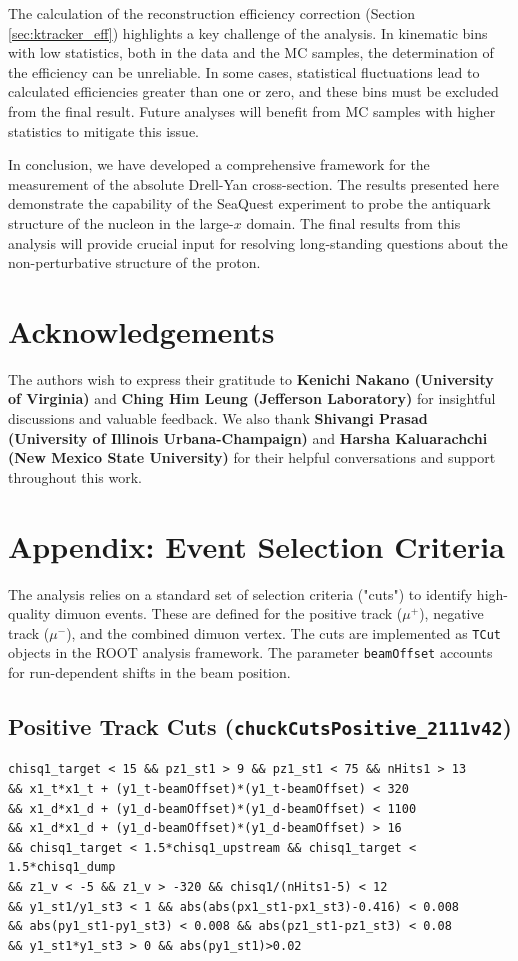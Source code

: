 \documentclass[11pt]{article}
\begin{document}
The calculation of the reconstruction efficiency correction (Section \ref{sec:ktracker_eff}) highlights a key challenge of the analysis. In kinematic bins with low statistics, both in the data and the MC samples, the determination of the efficiency can be unreliable. In some cases, statistical fluctuations lead to calculated efficiencies greater than one or zero, and these bins must be excluded from the final result. Future analyses will benefit from MC samples with higher statistics to mitigate this issue.

In conclusion, we have developed a comprehensive framework for the measurement of the absolute Drell-Yan cross-section. The results presented here demonstrate the capability of the SeaQuest experiment to probe the antiquark structure of the nucleon in the large-$x$ domain. The final results from this analysis will provide crucial input for resolving long-standing questions about the non-perturbative structure of the proton.

\section{Acknowledgements}
The authors wish to express their gratitude to \textbf{Kenichi Nakano (University of Virginia)} and \textbf{Ching Him Leung (Jefferson Laboratory)} for insightful discussions and valuable feedback. We also thank \textbf{Shivangi Prasad (University of Illinois Urbana-Champaign)} and \textbf{Harsha Kaluarachchi (New Mexico State University)} for their helpful conversations and support throughout this work.

\clearpage

\appendix
\section{Appendix: Event Selection Criteria}
\label{app:event_selection}

The analysis relies on a standard set of selection criteria ("cuts") to identify high-quality dimuon events. These are defined for the positive track ($\mu^+$), negative track ($\mu^-$), and the combined dimuon vertex. The cuts are implemented as \texttt{TCut} objects in the ROOT analysis framework. The parameter \texttt{beamOffset} accounts for run-dependent shifts in the beam position.

\subsection{Positive Track Cuts (\texttt{chuckCutsPositive\_2111v42})}
\label{cut:chuck_positive}
{\small\begin{verbatim}
chisq1_target < 15 && pz1_st1 > 9 && pz1_st1 < 75 && nHits1 > 13
&& x1_t*x1_t + (y1_t-beamOffset)*(y1_t-beamOffset) < 320
&& x1_d*x1_d + (y1_d-beamOffset)*(y1_d-beamOffset) < 1100
&& x1_d*x1_d + (y1_d-beamOffset)*(y1_d-beamOffset) > 16
&& chisq1_target < 1.5*chisq1_upstream && chisq1_target < 1.5*chisq1_dump
&& z1_v < -5 && z1_v > -320 && chisq1/(nHits1-5) < 12
&& y1_st1/y1_st3 < 1 && abs(abs(px1_st1-px1_st3)-0.416) < 0.008
&& abs(py1_st1-py1_st3) < 0.008 && abs(pz1_st1-pz1_st3) < 0.08
&& y1_st1*y1_st3 > 0 && abs(py1_st1)>0.02
\end{verbatim}}
\end{document}
